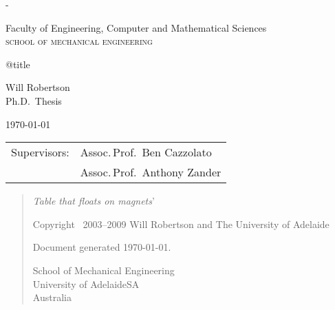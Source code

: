 
\thispagestyle{empty}
\label{titlepage}
\calccentering{\unitlength}
\begin{adjustwidth*}{\unitlength}{-\unitlength}
\setlength{\parindent}{0pt}

\begin{flushright}
\end{flushright}

\vfill

Faculty of Engineering,
Computer and Mathematical Sciences\\
\textsc{school of mechanical engineering}

\vfill

{\Large\raggedright\csname @title\endcsname}

\vspace{10mm}

Will Robertson\\
Ph.D.\ Thesis
\vspace{10mm}

\today

\vfill

\vfill

\begin{tabular}{@{}ll}
Supervisors:    & Assoc.\,Prof.\ Ben Cazzolato  \\
                & Assoc.\,Prof.\ Anthony Zander
\end{tabular}
\end{adjustwidth*}

\newpage
\thispagestyle{empty}
\null
\vfill
\begin{quote}
  \LARGE
  \textit{Table that floats on magnets}'

  \vfill
  \normalsize
  \raggedright
  Copyright \textcopyright\ 2003--2009 Will Robertson
  and The University of Adelaide

  \bigskip
  Document generated \today.

  \bigskip
  School of Mechanical Engineering\\
  University of Adelaide\quad SA\\
  Australia\\
\end{quote}


